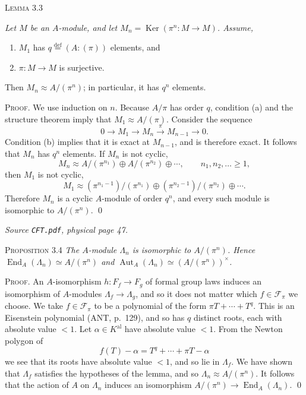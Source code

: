 \documentclass[11pt,a4paper]{article}
\begin{document}
\noindent\textsc{Lemma 3.3}
{\itshape Let $M$ be an $A$-module, and let
$M_n=\operatorname{Ker}(\pi^n\colon M\longrightarrow M)$. Assume,
\begin{enumerate}
\renewcommand{\labelenumi}{(\alph{enumi})}
\item $M_1$ has $q\overset{\mathrm{def}}{=}(A:(\pi))$ elements, and
\item $\pi\colon M\longrightarrow M$ is surjective.
\end{enumerate}
Then $M_n\approx A/(\pi^n)$; in particular, it has $q^n$ elements.}
\par\medskip
\noindent\textsc{Proof.} We use induction on $n$. Because $A/\pi$ has
order $q$, condition (a) and the structure theorem imply that
$M_1\approx A/(\pi)$. Consider the sequence
\[
0\longrightarrow M_1\longrightarrow M_n\xrightarrow{\pi}M_{n-1}
 \longrightarrow 0.
\]
Condition (b) implies that it is exact at $M_{n-1}$, and is therefore
exact. It follows that $M_n$ has $q^n$ elements. If $M_n$ is not cyclic,
\[
M_n\approx A/(\pi^{n_1})\oplus A/(\pi^{n_2})\oplus\cdots,
\qquad n_1,n_2,\ldots\geq 1,
\]
then $M_1$ is not cyclic,
\[
M_1\approx(\pi^{n_1-1})/(\pi^{n_1})\oplus
 (\pi^{n_2-1})/(\pi^{n_2})\oplus\cdots.
\]
Therefore $M_n$ is a cyclic $A$-module of order $q^n$, and every such
module is isomorphic to $A/(\pi^n)$.
\qed
\endgroup

\clearpage
\noindent\emph{Source \texttt{CFT.pdf}, physical page 47.}\par\medskip
\noindent\textsc{Proposition 3.4}
\emph{The $A$-module $\Lambda_n$ is isomorphic to $A/(\pi^n)$. Hence
$\operatorname{End}_A(\Lambda_n)\simeq A/(\pi^n)$ and
$\operatorname{Aut}_A(\Lambda_n)\simeq(A/(\pi^n))^\times$.}
\par\medskip
\noindent\textsc{Proof.} An $A$-isomorphism $h\colon F_f\longrightarrow F_g$
of formal group laws induces an isomorphism of $A$-modules
$\Lambda_f\longrightarrow\Lambda_g$, and so it does not matter which
$f\in\mathcal F_\pi$ we choose. We take $f\in\mathcal F_\pi$ to be a
polynomial of the form $\pi T+\cdots+T^q$. This is an Eisenstein
polynomial (ANT, p.~129), and so has $q$ distinct roots, each with absolute
value $<1$. Let $\alpha\in K^{\mathrm{al}}$ have absolute value $<1$.
From the Newton polygon of
\[
f(T)-\alpha=T^q+\cdots+\pi T-\alpha
\]
we see that its roots have absolute value $<1$, and so lie in $\Lambda_f$.
We have shown that $\Lambda_f$ satisfies the hypotheses of the lemma, and
so $\Lambda_n\approx A/(\pi^n)$. It follows that the action of $A$ on
$\Lambda_n$ induces an isomorphism
$A/(\pi^n)\longrightarrow\operatorname{End}_A(\Lambda_n)$.
\qed
\end{document}
